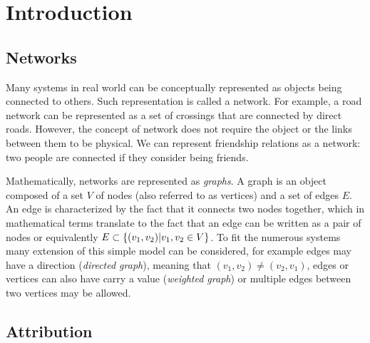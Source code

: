 \documentclass[
11pt, %
english, %
singlespacing, %
nolistspacing, %
liststotoc, %
headsepline, %
]{MastersDoctoralThesis} %
\begin{document}

\mainmatter %

\pagestyle{thesis} %

\listoftodos

\chapter{Introduction}

\section{Networks}

Many systems in real world can be conceptually represented as objects being connected to others. Such representation is called a network. For example, a road network can be represented as a set of crossings that are connected by direct roads. However, the concept of network does not require the object or the links between them to be physical. We can represent friendship relations as a network: two people are connected if they consider being friends.

Mathematically, networks are represented as \emph{graphs}. A graph is an object composed of a set $V$ of nodes (also referred to as vertices) and a set of edges $E$. An edge is characterized by the fact that it connects two nodes together, which in mathematical terms translate to the fact that an edge can be written as a pair of nodes or equivalently $E \subset \{(v_1, v_2) | v_1, v_2 \in V \}$. To fit the numerous systems many extension of this simple model can be considered, for example edges may have a direction (\emph{directed graph}), meaning that $(v_1, v_2) \neq (v_2, v_1)$, edges or vertices can also have carry a value (\emph{weighted graph}) or multiple edges between two vertices may be allowed.

\section{Attribution}

\end{document}
